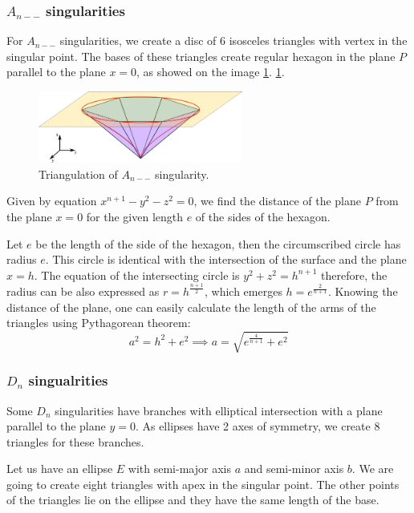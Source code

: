 \subsubsection*{$A_{n--}$ singularities}
For $A_{n--}$ singularities, we create a disc of $6$ isosceles triangles
with vertex in the singular point. The bases of these triangles create regular
hexagon in the plane $P$ parallel to the plane $x=0$, as showed on the image
\ref{img:11}.
\ref{img:11}.
\begin{figure}
    \centerline{\includegraphics[width=0.6\textwidth]{images/img11}}
    \caption[Triangulation of $A_{n--}$ singularity.]
    {Triangulation of $A_{n--}$ singularity.}
    \label{img:11}
\end{figure}
Given by equation $x^{n+1}-y^2-z^2=0$, we find the distance of the 
plane $P$ from the plane $x=0$ for the given length $e$ of the sides of
the hexagon.

Let $e$ be the length of the side of the hexagon, then the circumscribed
circle has radius $e$. This circle is identical with the intersection of
the surface and the plane $x=h$. The equation of the intersecting circle
is $y^2+z^2=h^{n+1}$ therefore, the radius can be also expressed as 
$r=h^{\frac{n+1}{2}}$, which emerges $h=e^{\frac{2}{n+1}}$. Knowing the
distance of the plane, one can easily calculate the length of the arms of
the triangles using Pythagorean theorem: 
$$a^2=h^2+e^2 \implies a = \sqrt{e^{\frac{4}{n+1}} + e^2}$$

\subsubsection*{$D_n$ singualrities}
Some $D_n$ singularities have branches with elliptical intersection with 
a plane parallel to the plane $y=0$. As ellipses have 2 axes of symmetry,
we create 8 triangles for these branches.

Let us have an ellipse $E$ with semi-major axis $a$ and semi-minor axis $b$.
We are going to create eight triangles with apex in the singular point. The other
points of the triangles lie on the ellipse and they have the same length
of the base.

